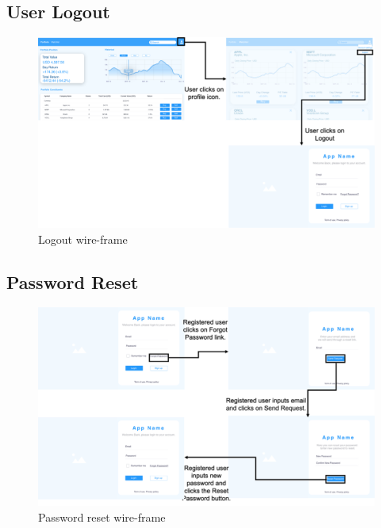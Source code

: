 \subsection{User Logout}
\begin{figure}[h]
    \centering
    \includegraphics[scale = 0.5]{./3_story_boards/Logout.png}
    \caption{Logout wire-frame}
    \label{fig:logout}
\end{figure}
\break


\subsection{Password Reset}
\begin{figure}[h]
    \centering
    \includegraphics[scale = 0.5]{./3_story_boards/Password.png}
    \caption{Password reset wire-frame}
    \label{fig:password}
\end{figure}